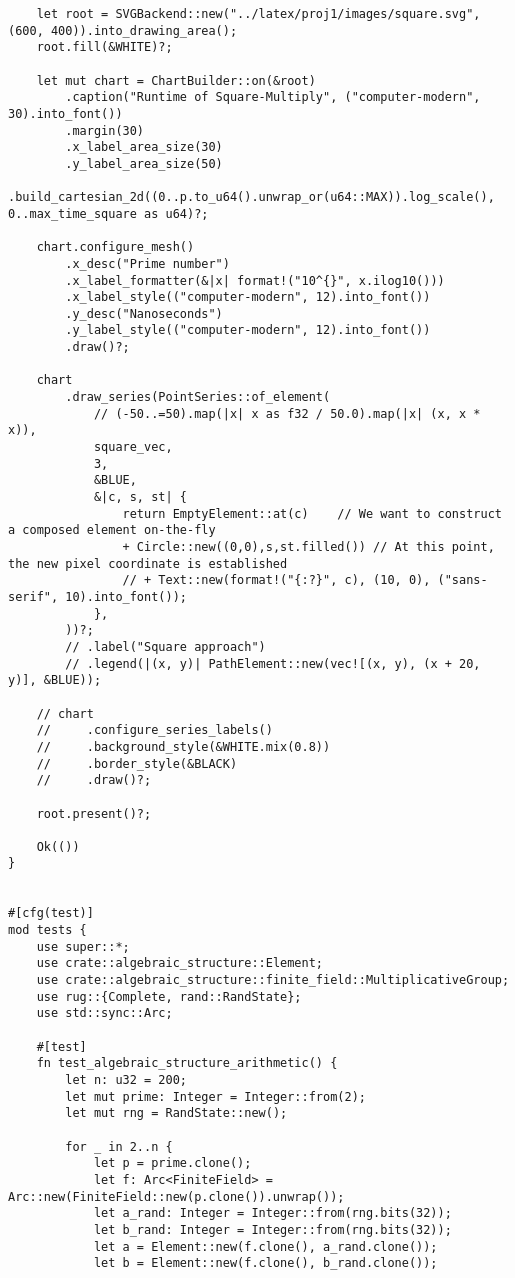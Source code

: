 \begin{verbatim}
    let root = SVGBackend::new("../latex/proj1/images/square.svg", (600, 400)).into_drawing_area();
    root.fill(&WHITE)?;

    let mut chart = ChartBuilder::on(&root)
        .caption("Runtime of Square-Multiply", ("computer-modern", 30).into_font())
        .margin(30)
        .x_label_area_size(30)
        .y_label_area_size(50)
        .build_cartesian_2d((0..p.to_u64().unwrap_or(u64::MAX)).log_scale(), 0..max_time_square as u64)?;

    chart.configure_mesh()
        .x_desc("Prime number")
        .x_label_formatter(&|x| format!("10^{}", x.ilog10()))
        .x_label_style(("computer-modern", 12).into_font())
        .y_desc("Nanoseconds")
        .y_label_style(("computer-modern", 12).into_font())
        .draw()?;

    chart
        .draw_series(PointSeries::of_element(
            // (-50..=50).map(|x| x as f32 / 50.0).map(|x| (x, x * x)),
            square_vec,
            3,
            &BLUE,
            &|c, s, st| {
                return EmptyElement::at(c)    // We want to construct a composed element on-the-fly
                + Circle::new((0,0),s,st.filled()) // At this point, the new pixel coordinate is established
                // + Text::new(format!("{:?}", c), (10, 0), ("sans-serif", 10).into_font());
            },
        ))?;
        // .label("Square approach")
        // .legend(|(x, y)| PathElement::new(vec![(x, y), (x + 20, y)], &BLUE));

    // chart
    //     .configure_series_labels()
    //     .background_style(&WHITE.mix(0.8))
    //     .border_style(&BLACK)
    //     .draw()?;

    root.present()?;

    Ok(())
}


#[cfg(test)]
mod tests {
    use super::*;
    use crate::algebraic_structure::Element;
    use crate::algebraic_structure::finite_field::MultiplicativeGroup;
    use rug::{Complete, rand::RandState};
    use std::sync::Arc;

    #[test]
    fn test_algebraic_structure_arithmetic() {
        let n: u32 = 200;
        let mut prime: Integer = Integer::from(2);
        let mut rng = RandState::new();

        for _ in 2..n {
            let p = prime.clone();
            let f: Arc<FiniteField> = Arc::new(FiniteField::new(p.clone()).unwrap());
            let a_rand: Integer = Integer::from(rng.bits(32));
            let b_rand: Integer = Integer::from(rng.bits(32));
            let a = Element::new(f.clone(), a_rand.clone());
            let b = Element::new(f.clone(), b_rand.clone());


\end{verbatim}

